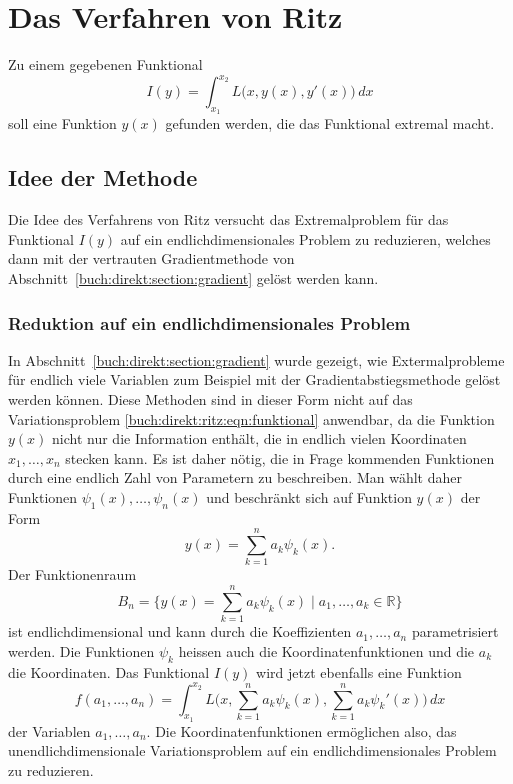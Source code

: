 %
%
%
\section{Das Verfahren von Ritz
\label{buch:direkt:section:ritz}}
Zu einem gegebenen Funktional
\begin{equation}
I(y)
=
\int_{x_1}^{x_2}
L\bigl(x,y(x),y'(x)\bigr)
\,dx
\label{buch:direkt:ritz:eqn:funktional}
\end{equation}
soll eine Funktion $y(x)$ gefunden werden, die das Funktional
extremal macht.

%
%
\subsection{Idee der Methode}
Die Idee des Verfahrens von Ritz
%
%
versucht das Extremalproblem für das Funktional $I(y)$ auf ein
endlichdimensionales Problem zu reduzieren, welches dann mit der
vertrauten Gradientmethode von
Abschnitt~\ref{buch:direkt:section:gradient} gelöst werden kann.

%
%
\subsubsection{Reduktion auf ein endlichdimensionales Problem}
In Abschnitt~\ref{buch:direkt:section:gradient} wurde gezeigt, wie 
Extermalprobleme für endlich viele Variablen zum Beispiel mit der
Gradientabstiegsmethode gelöst werden können.
Diese Methoden sind in dieser Form nicht auf das Variationsproblem
\eqref{buch:direkt:ritz:eqn:funktional} anwendbar, da die Funktion
$y(x)$ nicht nur die Information enthält, die in endlich vielen
Koordinaten $x_1,\dots,x_n$ stecken kann.
Es ist daher nötig, die in Frage kommenden Funktionen durch eine
endlich Zahl von Parametern zu beschreiben.
Man wählt daher Funktionen $\psi_1(x),\dots,\psi_n(x)$ und beschränkt
sich auf Funktion $y(x)$ der Form
\[
y(x)
=
\sum_{k=1}^n
a_k \psi_k(x).
\]
Der Funktionenraum 
\[
B_n
=
\biggl\{
y(x)
=
\sum_{k=1}^n a_k\psi_k(x)
\;
\bigg|
\;
a_1,\dots,a_k\in\mathbb{R}
\biggr\}
\]
ist endlichdimensional und kann durch die Koeffizienten $a_1,\dots,a_n$
parametrisiert werden.
Die Funktionen $\psi_k$ heissen auch die Koordinatenfunktionen und die
$a_k$ die Koordinaten.
Das Funktional $I(y)$ wird jetzt ebenfalls eine Funktion
\[
f(a_1,\dots,a_n)
=
\int_{x_1}^{x_2}
L\biggl(x,
\sum_{k=1}^n a_k\psi_k(x),
\sum_{k=1}^n a_k\psi_k'(x)
\biggr)
\,dx
\]
der Variablen $a_1,\dots,a_n$.
Die Koordinatenfunktionen ermöglichen also, das unendlichdimensionale
Variationsproblem auf ein endlichdimensionales Problem zu reduzieren.

